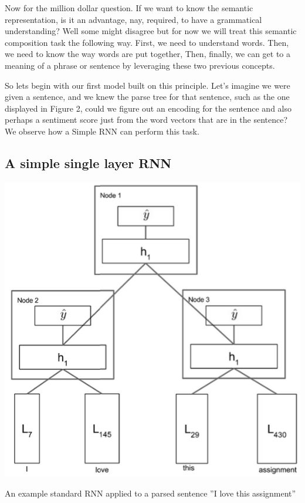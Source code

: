 \documentclass{tufte-handout}
\begin{document}
Now for the million dollar question. If we want to know the semantic representation, is it an advantage, nay, required, to have a grammatical understanding? Well some might disagree but for now we will treat this semantic composition task the following way. First, we need to understand words. Then, we need to know the way words are put together, Then, finally, we can get to a meaning of a phrase or sentence by leveraging these two previous concepts.

So lets begin with our first model built on this principle. Let's imagine we were given a sentence, and we knew the parse tree for that sentence, such as the one displayed in Figure 2, could we figure out an encoding for the sentence and also perhaps a sentiment score just from the word vectors that are in the sentence? We observe how a Simple RNN can perform this task.

\subsection{A simple single layer RNN}


\begin{marginfigure}%
  \includegraphics[width=\linewidth]{img3}
  \caption{An example standard RNN applied to a parsed sentence ''I love this assignment'' }
  \label{fig:img3}
\end{marginfigure}
\end{document}
